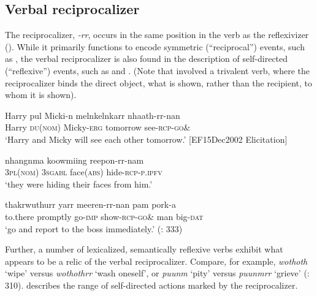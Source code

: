 \documentclass[output=paper]{langscibook}
\begin{document}
\subsection{Verbal reciprocalizer}\label{sec:Gaby:3.2}
The reciprocalizer, \textit{-rr}, occurs in the same position in the verb as the reflexivizer (). While it primarily functions to encode symmetric (“reciprocal”) events, such as , the verbal reciprocalizer is also found in the description of self-directed (“reflexive”) events, such as  and . (Note that  involved a trivalent verb, where the reciprocalizer binds the direct object, what is shown, rather than the recipient, to whom it is shown).

\ea 
    \label{ex:Gaby:11}
    \gll Harry pul Micki-n melnkelnkarr nhaath-rr-nan\\
    Harry  \textsc{du}(\textsc{nom})  Micky-\textsc{erg}  tomorrow  see-\textsc{rcp-go\&} \\
    \glt ‘Harry and Micky will see each other tomorrow.’ [EF15Dec2002 Elicitation]
    \z

 
  

\ea 
    \label{ex:Gaby:12}
      {nhangnma}  {koowmiing}  {reepon-rr-nam}\\
    \textsc{3pl}(\textsc{nom})  \textsc{3sg}\textsc{abl}  face(\textsc{abs})  hide-\textsc{rcp-p.ipfv} \\
    \glt ‘they were hiding their faces from him.’ \citep[392]{Hall1972}
    \z

 
\ea 
    \label{ex:Gaby:13}
      {thakrwuthurr}  {yarr}  {meeren-rr-nan}  {pam}  {pork-a}\\
   to.there  promptly  go-\textsc{imp}  show-\textsc{rcp-go\&} man  big-\textsc{dat} \\
    \glt ‘go and report to the boss immediately.’ (\citealt{FooteHall1992}: 333)
    \z
    

Further, a number of lexicalized, semantically reflexive verbs exhibit what appears to be a relic of the verbal reciprocalizer. Compare, for example, \textit{wothoth} ‘wipe’ versus \textit{wothothrr} ‘wash oneself’, or \textit{puunm} ‘pity’ versus \textit{puunmrr} ‘grieve’ (\citealt{FooteHall1992}: 310).  describes the range of self-directed actions marked by the reciprocalizer. 
\end{document}
